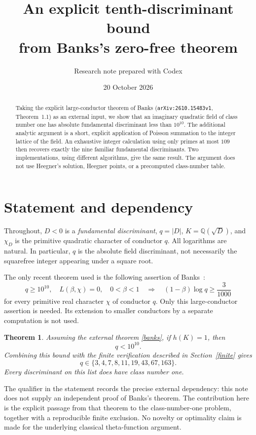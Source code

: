 \documentclass[11pt]{article}
\title{An explicit tenth-discriminant bound\\from Banks's zero-free theorem}
\author{Research note prepared with Codex}
\date{20 October 2026}
\newtheorem{theorem}{Theorem}
\newcommand{\Q}{\mathbb Q}
\newcommand{\norm}[1]{\lvert #1\rvert}
\begin{document}
\maketitle
\begin{abstract}
Taking the explicit large-conductor theorem of Banks
(\texttt{arXiv:2610.15483v1}, Theorem~1.1) as an external input, we show that
an imaginary quadratic field of class number one has absolute fundamental
discriminant less than \(10^{10}\).
The additional analytic argument is a short, explicit application of
Poisson summation to the integer lattice of the field.
An exhaustive integer calculation using only primes at most \(109\)
then recovers exactly the nine familiar fundamental discriminants.
Two implementations, using different algorithms, give the same result.
The argument does not use Heegner's solution, Heegner points, or a
precomputed class-number table.
\end{abstract}

\section{Statement and dependency}

Throughout, \(D<0\) is a \emph{fundamental discriminant},
\(q=\norm{D}\), \(K=\Q(\sqrt D)\), and \(\chi_D\) is the primitive
quadratic character of conductor \(q\). All logarithms are natural.
In particular, \(q\) is the absolute field discriminant, not necessarily
the squarefree integer appearing under a square root.

The only recent theorem used is the following assertion of Banks~\cite{banks}:
\begin{equation}\label{banks}
 q\ge 10^{10},\quad L(\beta,\chi)=0,\quad 0<\beta<1
 \quad\Longrightarrow\quad
 (1-\beta)\log q\ge \frac{3}{1000}
\end{equation}
for every primitive real character \(\chi\) of conductor \(q\).
Only this large-conductor assertion is needed. Its extension to smaller
conductors by a separate computation is not used.

\begin{theorem}\label{main}
Assuming the external theorem \eqref{banks}, if \(h(K)=1\), then
\[
 q<10^{10}.
\]
Combining this bound with the finite verification described in
Section~\ref{finite} gives
\[
 q\in\{3,4,7,8,11,19,43,67,163\}.
\]
Every discriminant on this list does have class number one.
\end{theorem}

The qualifier in the statement records the precise external dependency:
this note does not supply an independent proof of Banks's theorem.
The contribution here is the explicit passage from that theorem to the
class-number-one problem, together with a reproducible finite exclusion.
No novelty or optimality claim is made for the underlying classical
theta-function argument.
\end{document}
